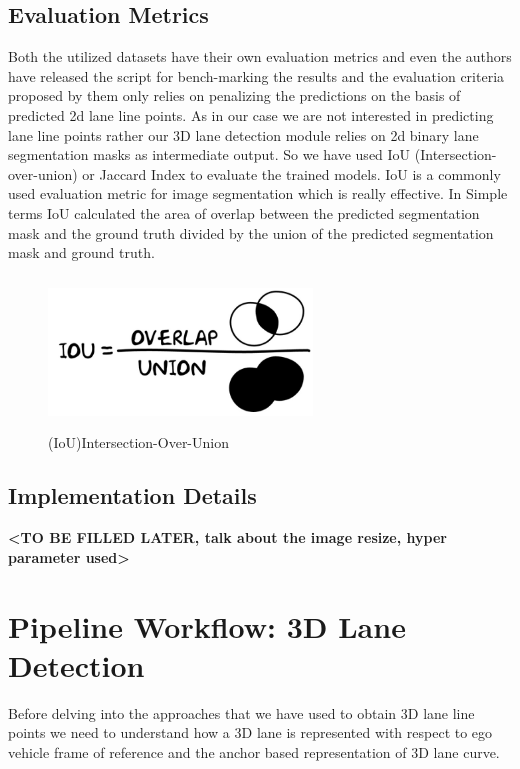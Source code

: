         \subsection{Evaluation Metrics}
        Both the utilized datasets have their own evaluation metrics and even the authors have released the script for bench-marking the results and the evaluation criteria proposed by them only relies on penalizing the predictions on the basis of predicted 2d lane line points. As in our case we are not interested in predicting lane line points rather our 3D lane detection module relies on 2d binary lane segmentation masks as intermediate output. So we have used IoU (Intersection-over-union) or Jaccard Index to evaluate the trained models. IoU is a commonly used evaluation metric for image segmentation which is really effective. In Simple terms IoU calculated the area of overlap between the predicted segmentation mask and the ground truth divided by the union of the predicted segmentation mask and ground truth.
        
         \begin{figure}[h]
    \centering
    \includegraphics[width=7cm, height=4cm]{images/IOU.png}
    \caption{(IoU)Intersection-Over-Union \footnotemark}
    \end{figure}
        
        \subsection{Implementation Details}
        \textbf{<TO BE FILLED LATER, talk about the image resize, hyper parameter used>}
        
        
        \section{Pipeline Workflow: 3D Lane Detection }
        Before delving into the approaches that we have used to obtain 3D lane line points we need to understand how a 3D lane is represented with respect to ego vehicle frame of reference and the anchor based representation of 3D lane curve.  
        
